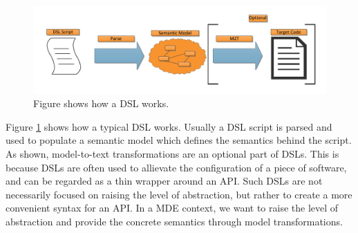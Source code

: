 \begin{figure}[h]
    \centering
    \centerline{\includegraphics[scale=0.65]{images/dslm2t.pdf}}
    \caption[Domain Specific Language concept]{Figure shows how a DSL works.}
    \label{fig:dslm2t}
\end{figure}
\newpage
Figure \ref{fig:dslm2t} shows how a typical DSL works. Usually a DSL script is parsed and used to populate a semantic model which defines the semantics behind the script. As shown, model-to-text transformations are an optional part of DSLs. This is because DSLs are often used to allievate the configuration of a piece of software, and can be regarded as a thin wrapper around an API. Such DSLs are not necessarily focused on raising the level of abstraction, but rather to create a more convenient syntax for an API. In a MDE context, we want to raise the level of abstraction and provide the concrete semantics through model transformations.

